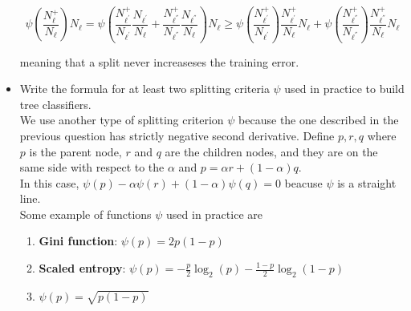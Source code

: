 \begin{itemize}
    $$
    \psi \left( \frac{N_{\ell}^+}{N_{\ell}}\right){N_{\ell}} = \psi \left( \frac{N_{\ell^{'}}^+}{N_{\ell^{'}}}\frac{N_{\ell^{'}}}{N_{\ell}} + \frac{N_{\ell^{''}}^+}{N_{\ell^{''}}}\frac{N_{\ell^{''}}}{N_{\ell}}\right){N_{\ell}} \geq \psi\left( \frac{N_{\ell^{'}}^+}{N_{\ell^{'}}}\right)\frac{N_{\ell^{'}}^+}{N_{\ell}}N_{\ell} + \psi\left( \frac{N_{\ell^{''}}^+}{N_{\ell^{''}}}\right)\frac{N_{\ell^{''}}^+}{N_{\ell}}N_{\ell}
    $$

    meaning that a split never increaseses the training error.\\

    \item Write the formula for at least two splitting criteria $\psi$ used in practice to build tree classifiers.\\ 
        
        We use another type of splitting criterion $\psi$ because the one described in the previous question has strictly negative second derivative. Define $p, r, q$ where $p$ is the parent node, $r$ and $q$ are the children nodes, and they are on the same side with respect to the $\alpha$ and $p = \alpha r + (1 - \alpha)q$.\\
        In this case, $\psi(p) - \alpha\psi(r) + (1 - \alpha)\psi(q) = 0$ beacuse $\psi$ is a straight line.\\

        Some example of functions $\psi$ used in practice are 
        \begin{enumerate}
            \item \textbf{Gini function}: $\psi(p) = 2p(1-p)$
            \item \textbf{Scaled entropy}: $\psi(p) = -\frac{p}{2}\log_2(p) - \frac{1-p}{2}\log_2(1-p)$
            \item $\psi(p) = \sqrt{p(1-p)}$
        \end{enumerate}
\end{itemize}
